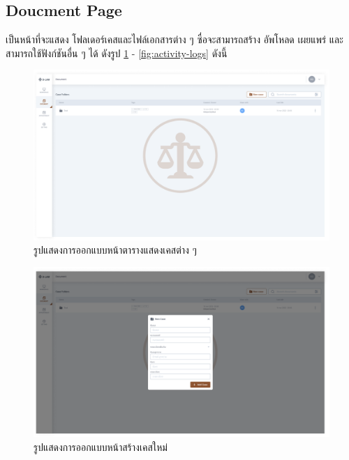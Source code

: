 \documentclass[12pt,oneside,openright,a4paper]{cpe-thai-project}
\begin{document}
\newpage
\subsection{Doucment Page}
\hspace*{1cm} เป็นหน้าที่จะแสดง โฟลเดอร์เคสและไฟล์เอกสารต่าง ๆ ซื่อจะสามารถสร้าง อัพโหลด เผยแพร่ และสามารถใช้ฟังก์ชันอื่น ๆ ได้ ดังรูป \ref{fig:case-folder} - \ref{fig:activity-logs} ดังนี้
\begin{figure}[!h]\centering
  \includegraphics[width=16cm]{./assets/userinterface/case-folder.png}
  \caption{รูปแสดงการออกแบบหน้าตารางแสดงเคสต่าง ๆ}\label{fig:case-folder}
\end{figure}

\begin{figure}[!h]\centering
  \includegraphics[width=16cm]{./assets/userinterface/new-case.png}
  \caption{รูปแสดงการออกแบบหน้าสร้างเคสใหม่}\label{fig:new-case}
\end{figure}
\end{document}
